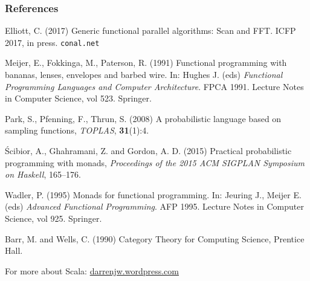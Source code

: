 \documentclass[mathserif,handout]{beamer}
\begin{document}
\begin{frame}
  \frametitle{References}
  \begin{thebibliography}{}

    \scriptsize

  \bibitem{} Elliott, C. (2017) \alert{Generic functional parallel algorithms: Scan and FFT}. \alert{ICFP 2017}, in press. \texttt{conal.net}
    
    \bibitem{} Meijer, E., Fokkinga, M., Paterson, R. (1991) \alert{Functional programming with bananas, lenses, envelopes and barbed wire}. In: Hughes J. (eds) \emph{Functional Programming Languages and Computer Architecture}. FPCA 1991. Lecture Notes in Computer Science, vol 523. Springer.

    \bibitem{} Park, S., Pfenning, F., Thrun, S. (2008) \alert{A probabilistic language based on sampling functions}, \emph{TOPLAS}, \textbf{31}(1):4.

   \'{S}cibior, A., Ghahramani, Z. and Gordon, A. D. (2015) \alert{Practical probabilistic programming with monads}, \emph{Proceedings of the 2015 ACM SIGPLAN Symposium on Haskell}, 165--176.

     \bibitem{} Wadler, P. (1995) \alert{Monads for functional programming}. In: Jeuring J., Meijer E. (eds) \emph{Advanced Functional Programming}. AFP 1995. Lecture Notes in Computer Science, vol 925. Springer.
    
\beamertemplatebookbibitems

 Barr, M. and Wells, C. (1990) \alert{Category Theory for Computing Science}, Prentice Hall.
    
  \end{thebibliography}

  
For more about Scala: \alert{\url{darrenjw.wordpress.com}}

\end{frame}
\end{document}
